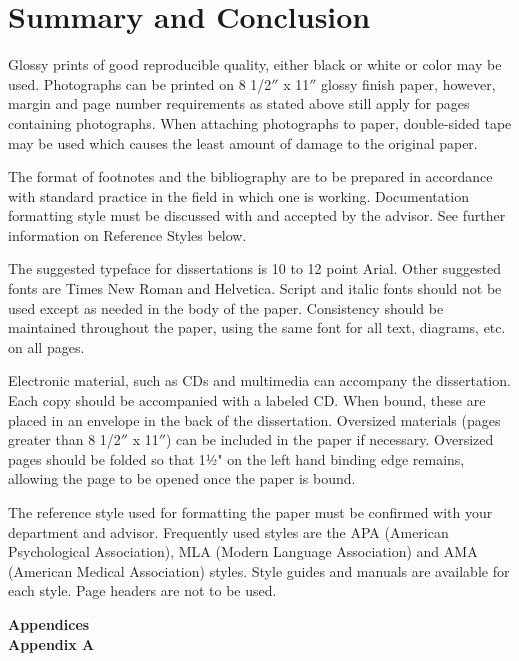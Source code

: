 \documentclass[12pt]{report}
\begin{document}
\chapter{Summary and Conclusion}

Glossy prints of good reproducible quality, either black or white or color may be used. Photographs can be printed on 8 1/2$''$ x 11$''$ glossy finish paper, however, margin and page number requirements as stated above still apply for pages containing photographs. When attaching photographs to paper, double-sided tape may be used which causes the least amount of damage to the original paper.

The format of footnotes and the bibliography are to be prepared in accordance with standard practice in the field in which one is working. Documentation formatting style must be discussed with and accepted by the advisor. See further information on Reference Styles below.

The suggested typeface for dissertations is 10 to 12 point Arial. Other suggested fonts are Times New Roman and Helvetica. Script and italic fonts should not be used except as needed in the body of the paper. Consistency should be maintained throughout the paper, using the same font for all text, diagrams, etc. on all pages.

Electronic material, such as CDs and multimedia can accompany the dissertation. Each copy should be accompanied with a labeled CD. When bound, these are placed in an envelope in the back of the dissertation.  Oversized materials (pages greater than 8 1/2$''$ x 11$''$) can be included in the paper if necessary. Oversized pages should be folded so that 1½" on the left hand binding edge remains, allowing the page to be opened once the paper is bound.

The reference style used for formatting the paper must be confirmed with your department and advisor. Frequently used styles are the APA (American Psychological Association), MLA (Modern Language Association) and AMA (American Medical Association) styles. Style guides and manuals are available for each style. Page headers are not to be used.

\newpage
{}	
\noindent \textbf{Appendices} \\
\noindent \textbf{Appendix A}    %
\vspace{12pt}
\end{document}
